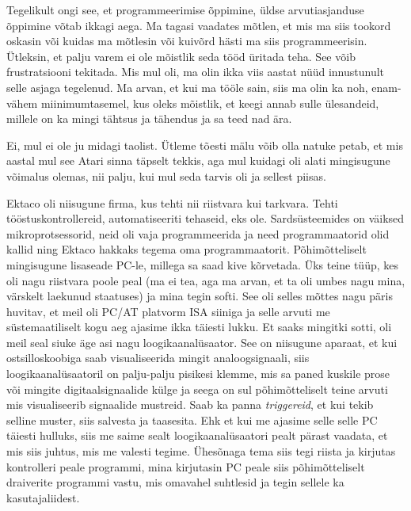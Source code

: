 
Tegelikult ongi see, et programmeerimise õppimine, üldse arvutiasjanduse 
õppimine võtab ikkagi aega. Ma tagasi vaadates mõtlen, et mis ma siis tookord 
oskasin või kuidas ma mõtlesin või  kuivõrd hästi ma siis programmeerisin.  
Ütleksin, et palju varem ei ole mõistlik seda tööd üritada teha. See võib  
frustratsiooni tekitada. Mis mul oli, ma olin ikka viis aastat nüüd innustunult 
selle asjaga tegelenud. Ma arvan, et kui ma  tööle sain, siis ma olin ka noh, 
enam-vähem miinimumtasemel, kus oleks  mõistlik, et keegi annab sulle 
ülesandeid, millele on ka mingi tähtsus ja tähendus ja sa teed nad  ära.


Ei, mul ei ole ju midagi taolist. Ütleme tõesti mälu võib olla natuke petab, et 
mis aastal mul see Atari sinna täpselt tekkis, aga mul kuidagi oli alati 
mingisugune võimalus olemas, nii palju, kui mul seda tarvis oli ja sellest 
piisas. 


Ektaco oli niisugune firma, kus tehti nii riistvara kui tarkvara. Tehti 
tööstuskontrollereid, automatiseeriti tehaseid, eks ole. Sardsüsteemides on väiksed mikroprotsessorid, neid oli vaja programmeerida 
ja need programmaatorid olid kallid ning Ektaco hakkaks tegema oma 
programmaatorit. Põhimõtteliselt mingisugune lisaseade PC-le, millega sa saad 
kive kõrvetada. Üks teine tüüp, kes oli nagu riistvara poole peal (ma 
ei tea, aga ma arvan, et ta oli umbes nagu mina, värskelt laekunud staatuses) 
ja mina tegin softi. See oli selles mõttes nagu päris huvitav, et meil oli 
PC/AT platvorm ISA siiniga ja selle arvuti me süstemaatiliselt kogu aeg 
ajasime ikka täiesti lukku. Et saaks mingitki sotti, oli meil 
seal siuke äge asi nagu loogikaanalüsaator. See on niisugune aparaat, et kui 
ostsilloskoobiga saab visualiseerida mingit analoogsignaali, siis 
loogikaanalüsaatoril on palju-palju pisikesi klemme, mis sa paned kuskile prose 
või mingite digitaalsignaalide külge ja seega on sul põhimõtteliselt teine arvuti mis  
visualiseerib signaalide mustreid. Saab ka panna 
\emph{triggereid}, et kui tekib selline muster,  siis salvesta ja 
taasesita. Ehk et kui me ajasime selle selle PC täiesti hulluks, siis me saime 
sealt loogikaanalüsaatori pealt pärast vaadata, et mis siis juhtus, mis me 
valesti tegime. Ühesõnaga tema siis tegi riista ja kirjutas  
kontrolleri peale programmi, mina kirjutasin PC peale siis põhimõtteliselt 
draiverite programmi vastu, mis omavahel suhtlesid ja tegin sellele ka 
kasutajaliidest.

